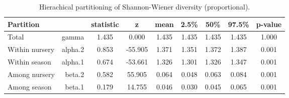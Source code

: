 \documentclass[12pt]{article}
\begin{document}
\begin{table}[ht]
\caption{Hierachical partitioning of Shannon-Wiener diversity (proportional).} 
\centering
\begin{tabular}{lrccccccc}
  \hline
 \textbf{Partition} & & \textbf{statistic} & \textbf{z} & \textbf{mean} & \textbf{2.5\%} & \textbf{50\%} & \textbf{97.5\%} & \textbf{p-value} \\ 
  \hline
  Total & gamma & 1.435 & 0.000 & 1.435 & 1.435 & 1.435 & 1.435 & 1.000 \\ 
  Within nursery & alpha.2 & 0.853 & -55.905 & 1.371 & 1.351 & 1.372 & 1.387 & 0.001 \\ 
  Within season	& alpha.1 & 0.674 & -53.661 & 1.326 & 1.301 & 1.326 & 1.347 & 0.001 \\ 
  Among nursery & beta.2 & 0.582 & 55.905 & 0.064 & 0.048 & 0.063 & 0.084 & 0.001 \\ 
  Among season & beta.1 & 0.179 & 14.755 & 0.046 & 0.030 & 0.045 & 0.065 & 0.001 \\ 
   \hline
\end{tabular}
\label{tab:adipart}
\end{table}
\end{document}
